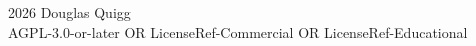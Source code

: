 \begin{titlepage}
  \centering
  \vfill
  {\Large{}} \\
  \vspace{2cm}
   \\
  \vspace{1cm}
  {\large{}} \\
  \vfill
   \\
   \\
  \vfill
  \vfill
  {\footnotesize \textcopyright{} 2026 Douglas Quigg \\
  AGPL-3.0-or-later OR LicenseRef-Commercial OR LicenseRef-Educational}
\end{titlepage}
